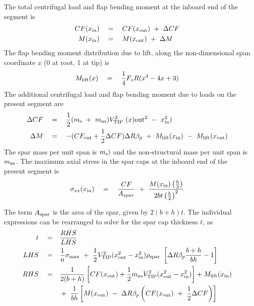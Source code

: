 The total centrifugal load and flap bending moment at the inboard end of the segment is 
\begin{align}
\label{eqns:cfbma}
CF(x_{\rm in}) \quad &= \quad CF(x_{\rm out}) \textrm{ }+\textrm{ } \Delta CF \\
\label{eqns:cfbmb}
M(x_{\rm in}) \quad &= \quad M(x_{\rm out}) \textrm{ }+\textrm{ } \Delta M 
\end{align}
The flap bending moment distribution due to lift, along the non-dimensional span coordinate $x$ (0 at root, 1 at tip) is 
\begin{equation}
M_{\rm lift}(x) \quad = \quad \frac{1}{4} F_z R (x^4 - 4 x + 3)
\end{equation}
The additional centrifugal load and flap bending moment due to loads on the present segment are 
\begin{align*}
\Delta CF \quad &= \quad \frac{1}{2} (m_{\rm s} \textrm{ }+\textrm{ } m_{\rm ns}) V_{\rm TIP}^2 \textrm{ } (x){\rm out}^2 \textrm{ } - \textrm{ } x_{\rm in}^2) \\
\Delta M \quad &= \quad - (CF_{\rm out} + \frac{1}{2} \Delta CF) \Delta R \beta_p \textrm{ }+\textrm{ } M_{\rm lift}(x_{\rm in}) \textrm{ } - \textrm{ } M_{\rm lift}(x_{\rm out}) 
\end{align*}
The spar mass per unit span is $m_{\rm s})$ and the non-structural mass per unit span is $m_{\rm ns}$.  The maximum axial stress in the spar caps at the inboard end of the present segment is
\begin{equation*}
\sigma_{\rm xx}(x_{\rm in}) \quad = \quad \frac{CF}{A_{spar}} \textrm{ }+\textrm{ } \frac{M(x_{\rm in}) \left(\frac{h}{2}\right)}{2 b t \left(\frac{h}{2}\right)^2}
\end{equation*}

The term $A_{\rm spar}$ is the area of the spar, given by $2 (b+h) t$. The individual expressions can be rearranged to solve for the spar cap thickness $t$, as 
\begin{align*}
t \quad =& \quad \frac{RHS}{LHS} \\
LHS \quad =& \quad \frac{1}{n} \sigma_{\rm max} \textrm{ }+\textrm{ } \frac{1}{2} V_{\rm TIP}^2 (x_{\rm out}^2 - x_{\rm in}^2) \rho_{\rm spar} \textrm{ } \left[\Delta R \beta_p \frac{b+h}{bh} - 1 \right] \\
RHS \quad =& \quad \frac{1}{2(b+h)} \left[CF(x_{\rm out}) + \frac{1}{2} m_{\rm ns} V_{\rm TIP}^2 (x_{\rm out}^2 - x_{\rm in}^2) \right] + M_{\rm lift}(x_{\rm in}) \\
& \quad + \textrm{ } \frac{1}{bh} \left[ M(x_{\rm out}) \textrm{ }-\textrm{ } \Delta R \beta_p  \left(CF(x_{\rm out}) \textrm{ }+\textrm{ } \frac{1}{2} \Delta CF\right)\right]
\end{align*}

